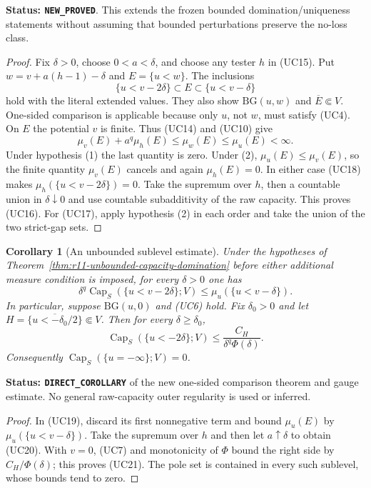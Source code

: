 \documentclass[11pt,a4paper]{article}
\numberwithin{equation}{section}
\newtheorem{corollary}[theorem]{Corollary}
\theoremstyle{definition}
\theoremstyle{remark}
\begin{document}
\noindent\textbf{Status: \texttt{NEW\_PROVED}}. This extends the
frozen bounded domination/uniqueness statements without assuming
that bounded perturbations preserve the no-loss class.

\begin{proof}
Fix $\delta>0$, choose $0<a<\delta$, and choose any tester
$h$ in (UC15). Put $w=v+a(h-1)-\delta$ and $E=\{u<w\}$.
The inclusions
\[
         \{u<v-2\delta\}\subset E\subset\{u<v-\delta\}
 \tag{UC18}
\]
hold with the literal extended values. They also show
$\mathrm{BG}(u,w)$ and $\overline E\Subset V$.
One-sided comparison is applicable because only $u$, not $w$,
must satisfy (UC4). On $E$ the potential $v$ is finite.
Thus (UC14) and (UC10) give
\[
 \mu_v(E)+a^q\mu_h(E)
            \leq\mu_w(E)\leq\mu_u(E)<\infty.
 \tag{UC19}
\]
Under hypothesis (1) the last quantity is zero. Under (2),
$\mu_u(E)\leq\mu_v(E)$, so the finite quantity
$\mu_v(E)$ cancels and again $\mu_h(E)=0$.
In either case (UC18) makes
$\mu_h(\{u<v-2\delta\})=0$. Take the supremum over $h$,
then a countable union in $\delta\downarrow0$ and use
countable subadditivity of the raw capacity. This proves (UC16).
For (UC17), apply hypothesis (2) in each order and take the
union of the two strict-gap sets.
\end{proof}

\begin{corollary}[An unbounded sublevel estimate]
\label{cor:r11-unbounded-sublevel-capacity}
Under the hypotheses of Theorem~\ref{thm:r11-unbounded-capacity-domination}
before either additional measure condition is imposed, for every
$\delta>0$ one has
\[
 \delta^q\operatorname{Cap}_S(\{u<v-2\delta\};V)
                 \leq\mu_u(\{u<v-\delta\}).
 \tag{UC20}
\]
In particular, suppose $\mathrm{BG}(u,0)$ and (UC6) hold.
Fix $\delta_0>0$ and let
$H=\overline{\{u<-\delta_0/2\}}\Subset V$.
Then for every $\delta\geq\delta_0$,
\[
 \operatorname{Cap}_S(\{u<-2\delta\};V)
                      \leq\frac{C_H}{\delta^q\Phi(\delta)}.
 \tag{UC21}
\]
Consequently $\operatorname{Cap}_S(\{u=-\infty\};V)=0$.
\end{corollary}

\noindent\textbf{Status: \texttt{DIRECT\_COROLLARY}} of the
new one-sided comparison theorem and gauge estimate. No general
raw-capacity outer regularity is used or inferred.

\begin{proof}
In (UC19), discard its first nonnegative term and bound
$\mu_u(E)$ by $\mu_u(\{u<v-\delta\})$. Take the
supremum over $h$ and then let $a\uparrow\delta$ to obtain
(UC20). With $v=0$, (UC7) and monotonicity of $\Phi$ bound
the right side by $C_H/\Phi(\delta)$; this proves (UC21).
The pole set is contained in every such sublevel, whose bounds
tend to zero.
\end{proof}
\end{document}
